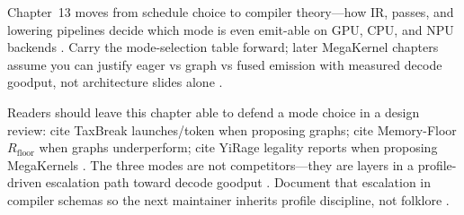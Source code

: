 Chapter~13 moves from schedule choice to compiler theory---how IR, passes, and lowering pipelines decide which mode is even emit-able on GPU, CPU, and NPU backends \citep{chen2020compilerbasedhardw,dlbook,amd2024xdna,liu2024deepseekv3,kwon2023vllm,amd2024aie,dao2023flashdecoding}. Carry the mode-selection table forward; later MegaKernel chapters assume you can justify eager vs graph vs fused emission with measured decode goodput, not architecture slides alone \citep{yirage2026,taxbreak2026,memoryfloor2026}.

Readers should leave this chapter able to defend a mode choice in a design review: cite TaxBreak launches/token when proposing graphs; cite Memory-Floor $R_{\mathrm{floor}}$ when graphs underperform; cite YiRage legality reports when proposing MegaKernels \citep{taxbreak2026,memoryfloor2026,yirage2026,patel2025llminference,nvidia2024cudagraphs,chen2020compilerbasedhardw,amd2024xdna,semianalysis2024tma,dao2022flashattention,kwon2023vllm,liu2024deepseekv3,dlbook,dao2023flashdecoding,amd2024aie,nvidia2022hopper}. The three modes are not competitors---they are layers in a profile-driven escalation path toward decode goodput \citep{patel2025llminference,taxbreak2026,memoryfloor2026,yirage2026,chen2020compilerbasedhardw,amd2024aie,amd2024xdna,nvidia2024cudagraphs,dao2022flashattention,kwon2023vllm,liu2024deepseekv3,dlbook,dao2023flashdecoding,semianalysis2024tma,nvidia2022hopper}. Document that escalation in compiler schemas so the next maintainer inherits profile discipline, not folklore \citep{yirage2026,chen2020compilerbasedhardw,patel2025llminference,taxbreak2026,memoryfloor2026,nvidia2024cudagraphs,amd2024xdna,semianalysis2024tma,dao2022flashattention,kwon2023vllm,liu2024deepseekv3,dlbook,dao2023flashdecoding,nvidia2022hopper,amd2024aie}.

